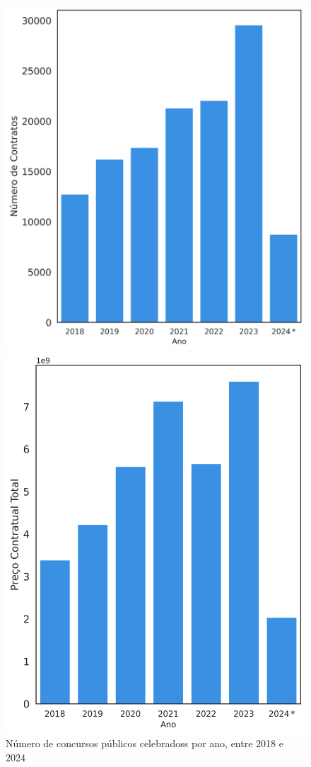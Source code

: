\begin{figure}[H]
\begin{minipage}{.31\linewidth}
		\includegraphics[width=\linewidth]{imagens/cpub_nrcontr.png}
		\caption{Número de concursos públicos celebradoss por ano, entre 2018 e 2024}
		\label{fig:precocps1}
	\end{minipage}
	\hfill
	\begin{minipage}{.31\linewidth}
		\includegraphics[width=\linewidth]{imagens/cpub_price.png}

\end{minipage}
\end{figure}
